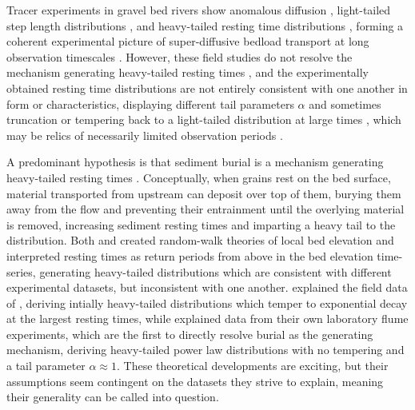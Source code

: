 \documentclass[draft]{agujournal2018}
\begin{document}
Tracer experiments in gravel bed rivers show anomalous diffusion \citep{Phillips2013, Martin2017}, light-tailed step length distributions \citep{Bradley2012, Hassan2013}, and heavy-tailed resting time distributions \citep{Voepel2013, Olinde2015, Pretzlav2017, Bradley2017}, forming a coherent experimental picture of super-diffusive bedload transport at long observation timescales \citep{Nikora2002, Martin2012}.
However, these field studies do not resolve the mechanism generating heavy-tailed resting times \citep[e.g.][]{Bradley2017}, and the experimentally obtained resting time distributions are not entirely consistent with one another in form or characteristics, displaying different tail parameters $\alpha$ and sometimes truncation \citep[e.g.][]{Voepel2013} or tempering back to a light-tailed distribution at large times \citep[e.g.][]{Bradley2017}, which may be relics of necessarily limited observation periods \citep[e.g.][]{Bradley2017}.

A predominant hypothesis is that sediment burial is a mechanism generating heavy-tailed resting times \citep{Voepel2013,Martin2014}.
Conceptually, when grains rest on the bed surface, material transported from upstream can deposit over top of them, burying them away from the flow and preventing their entrainment until the overlying material is removed, increasing sediment resting times and imparting a heavy tail to the distribution.
Both \citet{Voepel2013} and \citet{Martin2014} created random-walk theories of local bed elevation and interpreted resting times as return periods from above in the bed elevation time-series, generating heavy-tailed distributions which are consistent with different experimental datasets, but inconsistent with one another.
\citet{Voepel2013} explained the field data of \citet{Habersack2001}, deriving intially heavy-tailed distributions which temper to exponential decay at the largest resting times, while \citet{Martin2014} explained data from their own laboratory flume experiments, which are the first to directly resolve burial as the generating mechanism, deriving heavy-tailed power law distributions with no tempering and a tail parameter $\alpha \approx 1$.
These theoretical developments are exciting, but their assumptions seem contingent on the datasets they strive to explain, meaning their generality can be called into question.
\end{document}
